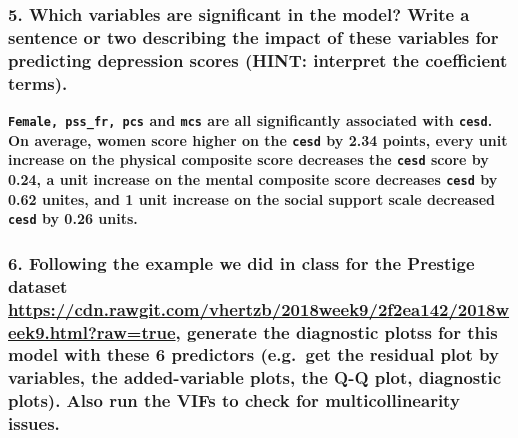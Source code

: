 \documentclass[10pt,letterpaper]{article}
\begin{document}
\subsubsection{5. Which variables are significant in the model? Write a
sentence or two describing the impact of these variables for predicting
depression scores (HINT: interpret the coefficient
terms).}\label{which-variables-are-significant-in-the-model-write-a-sentence-or-two-describing-the-impact-of-these-variables-for-predicting-depression-scores-hint-interpret-the-coefficient-terms.}

\textbf{\texttt{Female,\ pss\_fr,\ pcs} and \texttt{mcs} are all
significantly associated with \texttt{cesd}. On average, women score
higher on the \texttt{cesd} by 2.34 points, every unit increase on the
physical composite score decreases the \texttt{cesd} score by 0.24, a
unit increase on the mental composite score decreases \texttt{cesd} by
0.62 unites, and 1 unit increase on the social support scale decreased
\texttt{cesd} by 0.26 units.}

\subsubsection{\texorpdfstring{6. Following the example we did in class
for the Prestige dataset
\url{https://cdn.rawgit.com/vhertzb/2018week9/2f2ea142/2018week9.html?raw=true},
generate the diagnostic plotss for this model with these 6 predictors
(e.g.~get the residual plot by variables, the added-variable plots, the
Q-Q plot, diagnostic plots). Also run the VIFs to check for
multicollinearity
issues.}{6. Following the example we did in class for the Prestige dataset https://cdn.rawgit.com/vhertzb/2018week9/2f2ea142/2018week9.html?raw=true, generate the diagnostic plotss for this model with these 6 predictors (e.g.~get the residual plot by variables, the added-variable plots, the Q-Q plot, diagnostic plots). Also run the VIFs to check for multicollinearity issues.}}\label{following-the-example-we-did-in-class-for-the-prestige-dataset-httpscdn.rawgit.comvhertzb2018week92f2ea1422018week9.htmlrawtrue-generate-the-diagnostic-plotss-for-this-model-with-these-6-predictors-e.g.get-the-residual-plot-by-variables-the-added-variable-plots-the-q-q-plot-diagnostic-plots.-also-run-the-vifs-to-check-for-multicollinearity-issues.}
\end{document}
